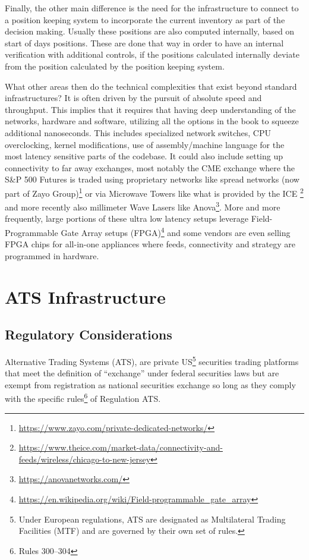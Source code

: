 Finally, the other main difference is the need for the infrastructure to connect to a position keeping system to incorporate the current inventory as part of the decision making. Usually these positions are also computed internally, based on start of days positions. These are done that way in order to have an internal verification with additional controls, if the positions calculated internally deviate from the position calculated by the position keeping system.


What other areas then do the technical complexities that exist beyond standard infrastructures? It is often driven by the pursuit of absolute speed and throughput. This implies that it requires that having deep understanding of the networks, hardware and software, utilizing all the options in the book to squeeze additional nanoseconds. This includes specialized network switches, CPU overclocking, kernel modifications, use of assembly/machine language for the most latency sensitive parts of the codebase. It could also include setting up connectivity to far away exchanges, most notably the CME exchange where the S\&P 500 Futures is traded using proprietary networks like spread networks (now part of Zayo Group)\footnote{\url{https://www.zayo.com/private-dedicated-networks/}} or via Microwave Towers like what is provided by the ICE \footnote{\url{https://www.theice.com/market-data/connectivity-and-feeds/wireless/chicago-to-new-jersey}} and more recently also millimeter Wave Lasers like Anova\footnote{\url{https://anovanetworks.com/}}. More and more frequently, large portions of these ultra low latency setups leverage Field-Programmable Gate Array setups (FPGA)\footnote{\url{https://en.wikipedia.org/wiki/Field-programmable_gate_array}} and some vendors are even selling FPGA chips for all-in-one appliances where  feeds, connectivity and strategy are programmed in hardware.



\section{ATS Infrastructure\label{sec:ats_infra}} \label{in:ats}
\subsection{Regulatory Considerations\label{sec:reg_considerations}}

Alternative Trading Systems (ATS), are private US\footnote{Under European regulations, ATS are designated as Multilateral Trading Facilities (MTF) and are governed by their own set of rules.} securities trading platforms that meet the definition of ``exchange'' under federal securities laws but are exempt from registration as national securities exchange so long as they comply with the specific rules\footnote{Rules 300--304} of Regulation ATS.


